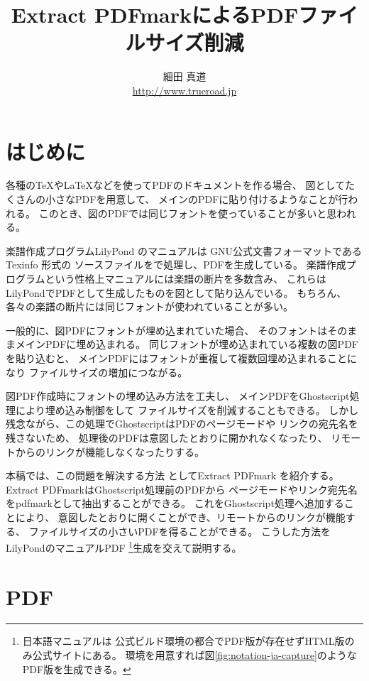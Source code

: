 \documentclass[twocolumn,jafontscale=0.962216,jlreq_notes]{jlreq}
\title{\textsf{Extract PDFmarkによるPDFファイルサイズ削減}}
\author{細田 真道 \\ \url{http://www.trueroad.jp}}
\date{} %
\begin{document}
\maketitle
\thispagestyle{fancy}

\section{はじめに}

各種の\TeX や\LaTeX などを使ってPDFのドキュメントを作る場合、
図としてたくさんの小さなPDFを用意して、
メインのPDFに貼り付けるようなことが行われる。
このとき、図のPDFでは同じフォントを使っていることが多いと思われる。

楽譜作成プログラムLilyPond \cite{lilypond}のマニュアルは
GNU公式文書フォーマットであるTexinfo \cite{texinfo}形式の
ソースファイルをで処理し、PDFを生成している。
楽譜作成プログラムという性格上マニュアルには楽譜の断片を多数含み、
これらはLilyPondでPDFとして生成したものを図として貼り込んでいる。
もちろん、各々の楽譜の断片には同じフォントが使われていることが多い。

一般的に、図PDFにフォントが埋め込まれていた場合、
そのフォントはそのままメインPDFに埋め込まれる。
同じフォントが埋め込まれている複数の図PDFを貼り込むと、
メインPDFにはフォントが重複して複数回埋め込まれることになり
ファイルサイズの増加につながる。

図PDF作成時にフォントの埋め込み方法を工夫し、
メインPDFをGhostscript処理により埋め込み制御をして
ファイルサイズを削減することもできる。
しかし残念ながら、この処理でGhostscriptはPDFのページモードや
リンクの宛先名を残さないため、
処理後のPDFは意図したとおりに開かれなくなったり、
リモートからのリンクが機能しなくなったりする。

本稿では、この問題を解決する方法
としてExtract PDFmark \cite{extractpdfmark}を紹介する。
Extract PDFmarkはGhostscript処理前のPDFから
ページモードやリンク宛先名をpdfmarkとして抽出することができる。
これをGhostscript処理へ追加することにより、
意図したとおりに開くことができ、リモートからのリンクが機能する、
ファイルサイズの小さいPDFを得ることができる。
こうした方法をLilyPondのマニュアルPDF \footnote{日本語マニュアルは
公式ビルド環境の都合でPDF版が存在せずHTML版のみ公式サイトにある。
環境を用意すれば図\ref{fig:notation-ja-capture}のような
PDF版を生成できる。}生成を交えて説明する。

\section{PDF}
\end{document}
